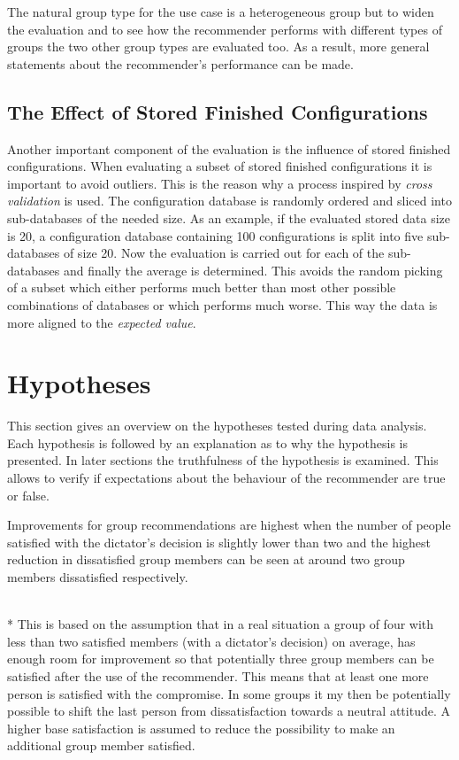 The natural group type for the use case is a heterogeneous group but to widen the evaluation and to see how the recommender performs with different types of groups the two other group types are evaluated too. As a result, more general statements about the recommender's performance can be made.

\subsection{The Effect of Stored Finished Configurations}

Another important component of the evaluation is the influence of stored finished configurations. When evaluating a subset of stored finished configurations it is important to avoid outliers. This is the reason why a process inspired by \emph{cross validation}  is used. The configuration database is randomly ordered and sliced into sub-databases of the needed size. As an example, if the evaluated stored data size is 20, a configuration database containing 100 configurations is split into five sub-databases of size 20. Now the evaluation is carried out for each of the sub-databases and finally the average is determined. This avoids the random picking of a subset which either performs much better than most other possible combinations of databases or which performs much worse. This way the data is more aligned to the \emph{expected value}. 


\section{Hypotheses}
\label{sec:Evaluation:Hypotheses}

This section gives an overview on the hypotheses tested during data analysis. Each hypothesis is followed by an explanation as to why the hypothesis is presented. In later sections the truthfulness of the hypothesis is examined. This allows to verify if expectations about the behaviour of the recommender are true or false.

\begin{hypothesis}
    \begin{itshape}
        \label{hyp:Evaluation:MaximumMinimum} Improvements for group recommendations are highest when the number of people satisfied with the dictator's decision is slightly lower than two and the highest reduction in dissatisfied group members can be seen at around two group members dissatisfied respectively.
    \end{itshape} \medskip \\*    
    This is based on the assumption that in a real situation a group of four with less than two satisfied members (with a dictator's decision) on average, has enough room for improvement so that potentially three group members can be satisfied after the use of the recommender. This means that at least one more person is satisfied with the compromise. In some groups it my then be potentially possible to shift the last person from dissatisfaction towards a neutral attitude. A higher base satisfaction is assumed to reduce the possibility to make an additional group member satisfied.
\end{hypothesis}



